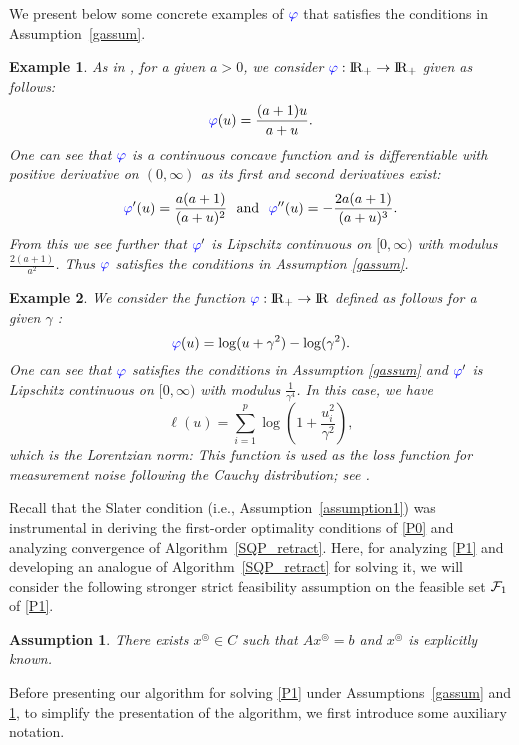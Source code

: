 \documentclass[10pt]{article}
\numberwithin{equation}{section}
\newtheorem{example}{Example}[section]
\newtheorem{assumption}{Assumption}[section]
\def\R{{\rm I\!R}}
\def\xfeasss{x^\circledcirc}
\begin{document}
We present below some concrete examples of ${\color{blue} \varphi}$ that satisfies the conditions in Assumption~\ref{gassum}.
\begin{example}
As in \cite{AhPX17}, for a given $a > 0$, we consider ${\color{blue} \varphi}:\R_+\rightarrow \R_+$ given as follows:
\[
{\color{blue} \varphi}(u) = \frac{(a + 1)u}{a + u}.
\]
One can see that ${\color{blue} \varphi}$ is a continuous concave function and is differentiable with positive derivative on $(0, \infty)$ as its first and second derivatives exist:
\[
{\color{blue} \varphi}'(u) = \frac{a(a+1)}{(a+u)^2}\ \text{ and }\  {\color{blue} \varphi}''(u) = -\frac{2a(a+1)}{(a+u)^3}.
\]
From this we see further that ${\color{blue} \varphi}'$ is Lipschitz continuous on $[0,\infty)$ with modulus $\frac{2(a+1)}{a^2}$. Thus ${\color{blue} \varphi}$ satisfies the conditions in Assumption \ref{gassum}.
\end{example}

\begin{example}\label{Loren}
We consider the function ${\color{blue} \varphi}:\R_+\to \R$ defined as follows for a given $\gamma$ \cite{CaWB08}:
\begin{equation*}
{\color{blue} \varphi}(u) = \log(u + \gamma^2) - \log(\gamma^2).
\end{equation*}
One can see that ${\color{blue} \varphi}$ satisfies the conditions in Assumption \ref{gassum} and ${\color{blue} \varphi}'$ is Lipschitz continuous on $[0,\infty)$ with modulus $\frac{1}{\gamma^4}$. In this case, we have
\[
\ell(u) = \sum_{i=1}^p \log\left(1 + \frac{u_i^2}{\gamma^2}\right),
\]
which is the Lorentzian norm: This function is used as the loss function for measurement noise following the Cauchy distribution; see \cite{CaBA10,CaRA16}.
\end{example}
Recall that the Slater condition (i.e., Assumption~\ref{assumption1}) was instrumental in deriving the first-order optimality conditions of \eqref{P0} and analyzing convergence of Algorithm~\ref{SQP_retract}.
Here, for analyzing \eqref{P1} and developing an analogue of Algorithm~\ref{SQP_retract} for solving it, we will consider the following stronger strict feasibility assumption on the feasible set ${\cal F}_1$ of \eqref{P1}.
\begin{assumption}\label{assumption4}
{\color{blue} There exists $\xfeasss\in C$ such that $A\xfeasss = b$ and $\xfeasss$ is explicitly known.}
\end{assumption}

Before presenting our algorithm for solving \eqref{P1} under Assumptions~\ref{gassum} and \ref{assumption4}, to simplify the presentation of the algorithm, we first introduce some auxiliary notation.
\end{document}
